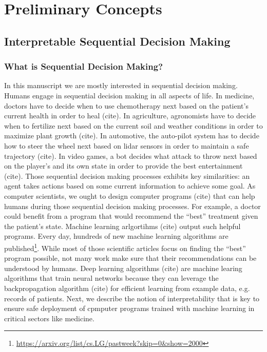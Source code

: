 \chapter*{Preliminary Concepts}
\section{Interpretable Sequential Decision Making}
\subsection{What is Sequential Decision Making?}

In this manuscript we are mostly interested in sequential decision making. Humans engage in sequential decision making in all aspects of life. In medicine, doctors have to decide when to use chemotherapy next based on the patient's current health in order to heal (cite). In agriculture, agronomists have to decide when to fertilize next based on the current soil and weather conditions in order to maximize plant growth (cite). 
In automotive, the auto-pilot system has to decide how to steer the wheel next based on lidar sensors in order to maintain a safe trajectory (cite). In video games, a bot decides what attack to throw next based on the player's and its own state in order to provide the best entertainment (cite).
Those sequential decision making processes exhibits key similarities: an agent takes actions based on some current information to achieve some goal.
As computer scientists, we ought to design computer programs (cite) that can help humans during those sequential decision making processes. 
For example, a doctor could benefit from a program that would recommend the ``best'' treatment given the patient's state. 
Machine learning arlgortihms (cite) output such helpful programs. Every day, hundreds of new machine learning algorithms are published\footnote{\url{https://arxiv.org/list/cs.LG/pastweek?skip=0&show=2000}}. While most of those scientific articles focus on finding the ``best'' program possible, not many work make sure that their recommendations can be understood by humans.
Deep learning algorithms (cite) are machine learing algorithms that train neural networks because they can leverage the backpropagation algorithm (cite) for efficient learning from example data, e.g. records of patients.
Next, we describe the notion of interpretability that is key to ensure safe deployment of cpmputer programs trained with machine learning in critical sectors like medicine. 

